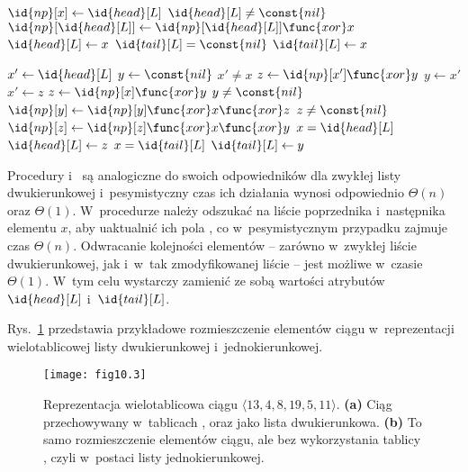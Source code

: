 \begin{codebox}
\li	$\id{np}[x]\gets\id{head}[L]$
\li	\If $\id{head}[L]\ne\const{nil}$
\li		\Then $\id{np}[\id{head}[L]]\gets\id{np}[\id{head}[L]]\func{xor}x$
		\End
\li	$\id{head}[L]\gets x$
\li	\If $\id{tail}[L]=\const{nil}$
\li		\Then $\id{tail}[L]\gets x$
		\End
\end{codebox}

\begin{codebox}
\li	$x'\gets\id{head}[L]$
\li	$y\gets\const{nil}$
\li	\While $x'\ne x$
\li		\Do
			$z\gets\id{np}[x']\func{xor}y$
\li			$y\gets x'$
\li			$x'\gets z$
		\End
\li	$z\gets\id{np}[x]\func{xor}y$
\li	\If $y\ne\const{nil}$
\li		\Then $\id{np}[y]\gets\id{np}[y]\func{xor}x\func{xor}z$
		\End
\li	\If $z\ne\const{nil}$
\li		\Then $\id{np}[z]\gets\id{np}[z]\func{xor}x\func{xor}y$
		\End
\li	\If $x=\id{head}[L]$
\li		\Then $\id{head}[L]\gets z$
		\End
\li	\If $x=\id{tail}[L]$
\li		\Then $\id{tail}[L]\gets y$
		\End
\end{codebox}

Procedury  i~ są analogiczne do swoich odpowiedników dla zwykłej listy dwukierunkowej i~pesymistyczny czas ich działania wynosi odpowiednio $\Theta(n)$ oraz $\Theta(1)$. W~procedurze  należy odszukać na liście poprzednika i~następnika elementu $x$, aby uaktualnić ich pola , co w~pesymistycznym przypadku zajmuje czas $\Theta(n)$. Odwracanie kolejności elementów -- zarówno w~zwykłej liście dwukierunkowej, jak i~w~tak zmodyfikowanej liście -- jest możliwe w~czasie $\Theta(1)$. W~tym celu wystarczy zamienić ze sobą wartości atrybutów $\id{head}[L]$ i~$\id{tail}[L]$. 


\exercise %
Rys.~\ref{fig:10.3-1} przedstawia przykładowe rozmieszczenie elementów ciągu w~reprezentacji wielotablicowej listy dwukierunkowej i~jednokierunkowej.
\begin{figure}[ht]
	\begin{center}
		\texttt{[image: fig10.3]}
	\end{center}
	\caption{Reprezentacja wielotablicowa ciągu $\langle13,4,8,19,5,11\rangle$. {\sffamily\bfseries(a)} Ciąg przechowywany w~tablicach ,  oraz  jako lista dwukierunkowa. {\sffamily\bfseries(b)} To samo rozmieszczenie elementów ciągu, ale bez wykorzystania tablicy , czyli w~postaci listy jednokierunkowej.} \label{fig:10.3-1}
\end{figure}

